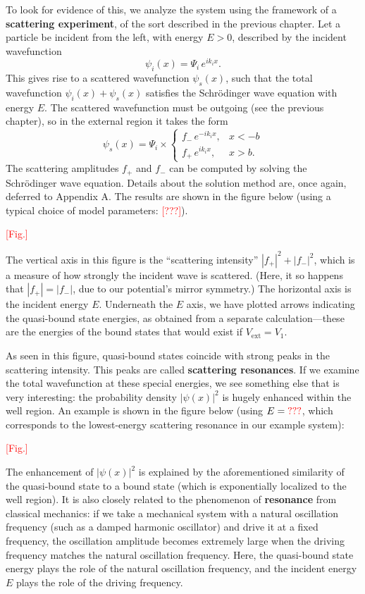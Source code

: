 \documentclass[pra,12pt]{revtex4}
\begin{document}
To look for evidence of this, we analyze the system using the
framework of a \textbf{scattering experiment}, of the sort described
in the previous chapter.  Let a particle be incident from the left,
with energy $E > 0$, described by the incident wavefunction
$$\psi_i(x) = \Psi_i \, e^{ik_i x}.$$
This gives rise to a scattered wavefunction $\psi_s(x)$, such that the
total wavefunction $\psi_i(x) + \psi_s(x)$ satisfies the Schr\"odinger
wave equation with energy $E$.  The scattered wavefunction must be
outgoing (see the previous chapter), so in the external region it
takes the form
$$\psi_s(x) = \Psi_i \times \begin{cases}f_- \,e^{-ik_ix}, & x < -b \\ f_+ \,e^{ik_ix}, & x > b.\end{cases}$$
The scattering amplitudes $f_+$ and $f_-$ can be computed by solving
the Schr\"odinger wave equation.  Details about the solution method
are, once again, deferred to Appendix A.  The results are shown in the
figure below (using a typical choice of model parameters:
\textcolor{red}{[???]}).

\textcolor{red}{[Fig.]}

The vertical axis in this figure is the ``scattering intensity''
$|f_+|^2 + |f_-|^2$, which is a measure of how strongly the incident
wave is scattered.  (Here, it so happens that $|f_+| = |f_-|$, due to
our potential's mirror symmetry.)  The horizontal axis is the incident
energy $E$.  Underneath the $E$ axis, we have plotted arrows
indicating the quasi-bound state energies, as obtained from a separate
calculation---these are the energies of the bound states that would
exist if $V_{\mathrm{ext}} = V_1$.

As seen in this figure, quasi-bound states coincide with strong peaks
in the scattering intensity.  This peaks are called \textbf{scattering
  resonances}.  If we examine the total wavefunction at these special
energies, we see something else that is very interesting: the
probability density $|\psi(x)|^2$ is hugely enhanced within the well
region.  An example is shown in the figure below (using $E =
\textcolor{red}{???}$, which corresponds to the lowest-energy
scattering resonance in our example system):

\textcolor{red}{[Fig.]}

The enhancement of $|\psi(x)|^2$ is explained by the aforementioned
similarity of the quasi-bound state to a bound state (which is
exponentially localized to the well region).  It is also closely
related to the phenomenon of \textbf{resonance} from classical
mechanics: if we take a mechanical system with a natural oscillation
frequency (such as a damped harmonic oscillator) and drive it at a
fixed frequency, the oscillation amplitude becomes extremely large
when the driving frequency matches the natural oscillation frequency.
Here, the quasi-bound state energy plays the role of the natural
oscillation frequency, and the incident energy $E$ plays the role of
the driving frequency.
\end{document}
